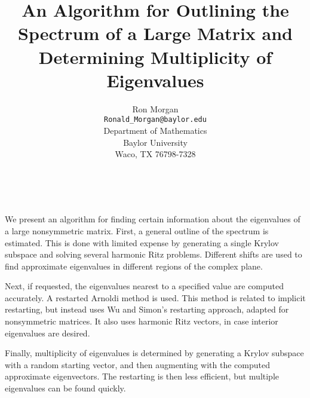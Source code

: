 \documentclass[11pt]{article}
\date{ ~ \hspace{-4mm}}
\title{An Algorithm for Outlining the Spectrum of a Large Matrix and Determining Multiplicity of Eigenvalues  }
\author{Ron Morgan \\ {\tt  Ronald\_Morgan@baylor.edu} \\ Department of Mathematics \\ Baylor University \\ Waco, TX 76798-7328}
\begin{document}
\maketitle
\thispagestyle{empty}





 



We present an algorithm for finding certain information about the eigenvalues of a large nonsymmetric matrix.  First, a general outline of the spectrum is estimated.   This is done with limited expense by generating a single Krylov subspace and solving several harmonic Ritz problems.  Different shifts are used to find approximate eigenvalues in different regions of the complex plane.

Next, if requested, the eigenvalues nearest to a specified value are computed accurately.  A restarted Arnoldi method is used.  This method is related to implicit restarting, but instead uses Wu and Simon's restarting approach, adapted for nonsymmetric matrices.  It also uses harmonic Ritz vectors, in case interior eigenvalues are desired.

Finally, multiplicity of eigenvalues is determined by generating a Krylov subspace with a random  starting vector, and then augmenting with the computed approximate eigenvectors.  The restarting is then less efficient, but multiple eigenvalues can be found quickly.
\end{document}
